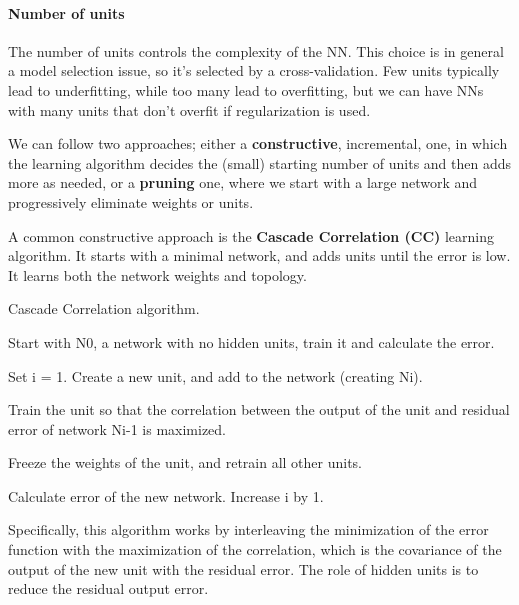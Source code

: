 \paragraph{Number of units}

The number of units controls the complexity of the NN. This choice is in general a model selection issue, so it's selected by a cross-validation. Few units typically lead to underfitting, while too many lead to overfitting, but we can have NNs with many units that don't overfit if regularization is used.

We can follow two approaches; either a \textbf{constructive}, incremental, one, in which the learning algorithm decides the (small) starting number of units and then adds more as needed, or a \textbf{pruning} one, where we start with a large network and progressively eliminate weights or units.

A common constructive approach is the \textbf{Cascade Correlation (CC)} learning algorithm. It starts with a minimal network, and adds units until the error is low. It learns both the network weights and topology.

\begin{algorithm}
\caption{Cascade Correlation algorithm.}
\begin{algorithmic}[1]
    \State Start with N0, a network with no hidden units, train it and calculate the error.

        \State Set i = 1.
        \Repeat 
            \State Create a new unit, and add to the network (creating Ni).
            
            \State Train the unit so that the correlation between the output of the unit and residual error of network Ni-1 is maximized.

            \State Freeze the weights of the unit, and retrain all other units.
            
            \State Calculate error of the new network.
            \State Increase i by 1.
    \EndIf
\end{algorithmic}
\end{algorithm}

Specifically, this algorithm works by interleaving the minimization of the error function with the maximization of the correlation, which is the covariance of the output of the new unit with the residual error. The role of hidden units is to reduce the residual output error.

